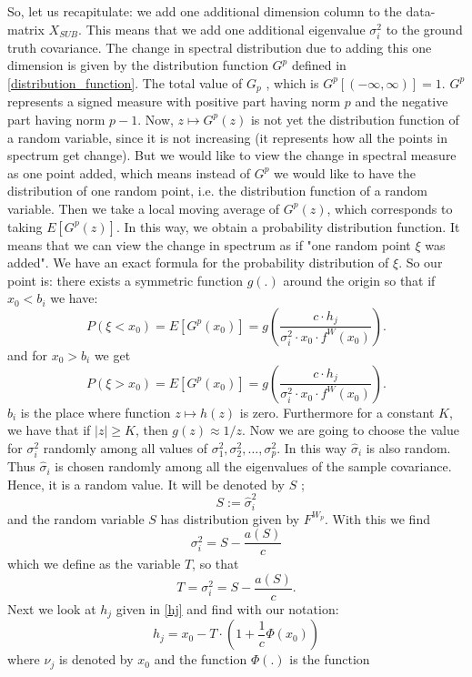 \documentclass[12pt]{amsart}
\theoremstyle{definition}
\numberwithin{equation}{section}
\numberwithin{equation}{section}
\theoremstyle{remark}
\numberwithin{equation}{section}
\begin{document}
So, let us recapitulate: we add one additional dimension column to the data-matrix $X_{SUB}$. This means that we add one additional eigenvalue $\sigma^2_i$ to the ground truth covariance. The change in spectral distribution due to adding this one dimension is given by the distribution function $G^p$ defined in \ref{distribution_function}. The total value of $G_p$ , which is $G^p[(-\infty,\infty)]=1$. $G^p$ represents a signed measure with positive part having norm $p$ and the negative part having
norm $p-1$. Now, $z\mapsto G^p(z)$ is not yet the distribution function of a random variable, since it is not increasing (it represents how all the points in spectrum get change). But we would like to view the change in spectral measure as one point added, which means instead
of $G^p$ we would like to have the distribution of one random point, i.e. the distribution function of a random variable.
Then we take a local moving average of $G^p(z)$, which corresponds to taking $E[G^p(z)]$. In this way, we obtain a probability distribution function. It means that we can view the change in spectrum as if "one random point $\xi$ was added". We have an exact formula for the probability distribution of $\xi$. So our point is: there exists a symmetric function $g(.)$ around the origin so that if $x_0<b_i$ we have:
\begin{equation}
\label{dothat}
P(\xi<x_0)=E[G^p(x_0)]=g\left(\frac{c\cdot h_j}{\sigma_i^2\cdot x_0\cdot f^W(x_0)}\right).
\end{equation}
and for $x_0>b_i$ we get
$$P(\xi>x_0)=E[G^p(x_0)]=g\left(\frac{c\cdot h_j}{\sigma_i^2\cdot x_0\cdot f^W(x_0)}\right).$$
$b_i$ is the place where function $z\mapsto h(z)$ is zero.
Furthermore for a constant $K$, we have that if $|z|\geq K$, then $g(z)\approx 1/z$. Now we are going to choose the value for $\sigma^2_i$ randomly among all values of $\sigma^2_1,\sigma^2_2,\ldots,\sigma^2_p$. In this way $\hat{\sigma}_i$ is also random. Thus $\hat{\sigma}_i$ is chosen randomly among all the eigenvalues of the sample covariance. Hence, it is a random value. It will be denoted by $S$ ;
$$S:=\hat{\sigma}^2_i$$
and the random variable $S$ has distribution given by $F^{W_p}$. With this we find
$$\sigma^2_i=S-\frac{a(S)}{c}$$
which we define as the variable $T$, so that
$$T=\sigma_i^2=S-\frac{a(S)}{c}.$$
Next we look at $h_j$ given in \ref{hj} and find with our notation:
\begin{equation}
\label{hj2}
h_j=x_0-T\cdot\left(1+\frac{1}{c}\Phi(x_0)\right)
\end{equation}
where $\nu_j$ is denoted by $x_0$ and the function $\Phi(.)$ is the function
\end{document}

